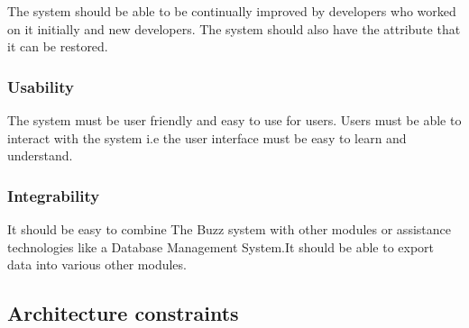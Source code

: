 \documentclass[10pt]{article}
\begin{document}
The system should be able to be continually improved by developers who worked on it initially and new developers.
The system should also have the attribute that it can be restored.

\subsubsection{Usability}

The system must be user friendly and easy to use for users. Users must be able to interact with the system i.e the user interface must be easy to learn and understand.

\subsubsection{Integrability}

It should be easy to combine The Buzz system with other modules or assistance technologies like a Database Management System.It should be able to export data into various other modules.


\clearpage

\subsection{Architecture constraints} %
\end{document}
